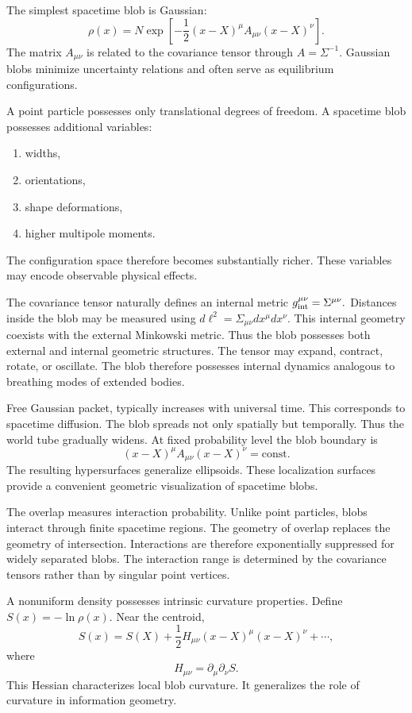 The simplest spacetime blob is Gaussian:
\[
    \rho(x) = N \exp \left[-\frac{1}{2} (x-X)^\mu A_{\mu\nu} (x-X)^\nu\right].
\]
The matrix $A_{\mu\nu}$ is related to the covariance tensor through
$A = \Sigma^{-1}.$
Gaussian blobs minimize uncertainty relations and often serve as equilibrium
configurations.

A point particle possesses only translational degrees of freedom.
A spacetime blob possesses additional variables:
\begin{enumerate}
\item widths,
\item orientations,
\item shape deformations,
\item higher multipole moments.
\end{enumerate}
The configuration space therefore becomes substantially richer.
These variables may encode observable physical effects.

The covariance tensor naturally defines an internal metric
$g_{\rm int}^{\mu\nu} = \Sigma^{\mu\nu}.$
Distances inside the blob may be measured using
$ d\ell^2 = \Sigma_{\mu\nu} dx^\mu dx^\nu.$
This internal geometry coexists with the external Minkowski metric.
Thus the blob possesses both external and internal geometric structures.
The tensor may expand, contract, rotate, or oscillate.
The blob therefore possesses internal dynamics analogous to breathing
modes of extended bodies.

Free Gaussian packet,
typically increases with universal time.
This corresponds to spacetime diffusion.
The blob spreads not only spatially but temporally.
Thus the world tube gradually widens.
At fixed probability level
the blob boundary is
\[(x-X)^\mu A_{\mu\nu} (x-X)^\nu = \mathrm{const}.\]
The resulting hypersurfaces generalize ellipsoids.
These localization surfaces provide a convenient geometric visualization
of spacetime blobs.

The overlap measures interaction probability.
Unlike point particles, blobs interact through finite spacetime regions.
The geometry of overlap replaces the geometry of intersection.
Interactions are therefore exponentially suppressed for widely separated blobs.
The interaction range is determined by the covariance tensors rather than
by singular point vertices.

A nonuniform density possesses intrinsic curvature properties.
Define
$S(x) = -\ln\rho(x).$
Near the centroid,
\[
    S(x) = S(X)+\frac{1}{2}H_{\mu\nu}(x-X)^\mu (x-X)^\nu+\cdots,
\]
where
\[
H_{\mu\nu} = \partial_\mu\partial_\nu S.
\]
This Hessian characterizes local blob curvature.
It generalizes the role of curvature in information geometry.


